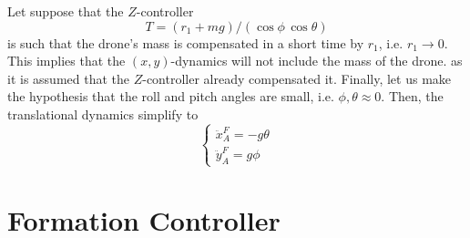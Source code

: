 \documentclass{ifacconf}
\begin{document}
Let suppose that the $Z$-controller 
\begin{equation}
    T = (r_1 + mg) / (\cos \phi \, \cos \theta)
\end{equation}
is such that the drone's mass is compensated in a short time
by $r_1$, i.e. $r_1 \to 0$.
This implies that the $(x,y)$-dynamics will not include the mass of the drone.
as it is assumed that the $Z$-controller already compensated it.
Finally, let us make the hypothesis that the roll and pitch angles 
are small, i.e. $\phi,\theta \approx 0$.
Then, the translational dynamics simplify to 
\begin{equation}
    \begin{cases}
        \ddot{x}^F_A = -g\theta \\
        \ddot{y}^F_A = g\phi
    \end{cases}
\end{equation}

\section{Formation Controller}
\label{sec:formation_controller}
\end{document}
